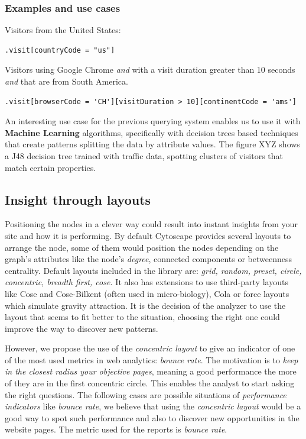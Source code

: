 \documentclass[preprint,12pt,3p]{elsarticle}
\begin{document}
\subsubsection{Examples and use cases}
\label{sec:examples}
Visitors from the United States:
\begin{lstlisting}
.visit[countryCode = "us"]
\end{lstlisting}

Visitors using Google Chrome \textit{and} with a visit duration greater than 10 seconds \textit{and} that are from South America.
\begin{lstlisting}
.visit[browserCode = 'CH'][visitDuration > 10][continentCode = 'ams']
\end{lstlisting}

An interesting use case for the previous querying system enables us to use it with \textbf{Machine Learning} algorithms, specifically with decision trees based techniques that create patterns splitting the data by attribute values. The figure XYZ shows a J48 decision tree \cite{} trained with traffic data, spotting clusters of visitors that match certain properties.

\subsection{Insight through layouts}

Positioning the nodes in a clever way could result into instant insights from your site and how it is performing. By default Cytoscape provides several layouts to arrange the node, some of them would position the nodes depending on the graph's attributes like the node's \textit{degree}, connected components or betweenness centrality. Default layouts included in the library are: \textit{grid, random, preset, circle, concentric, breadth first, cose.}
It also has extensions to use third-party layouts like Cose and Cose-Bilkent \cite{} (often used in micro-biology), Cola \cite{} or force layouts \cite{} which simulate gravity attraction. It is the decision of the analyzer to use the layout that seems to fit better to the situation, choosing the right one could improve the way to discover new patterns.

However, we propose the use of the \textit{concentric layout} to give an indicator of one of the most used metrics in web analytics: \textit{bounce rate}. The motivation is to \textit{keep in the closest radius your objective pages}, meaning a good performance the more of they are in the first concentric circle. This enables the analyst to start asking the right questions.
The following cases are possible situations of \textit{performance indicators} like \textit{bounce rate}, we believe that using the \textit{concentric layout} would be a good way to spot such performance and also to discover new opportunities in the website pages. The metric used for the reports is \textit{bounce rate}.
\end{document}
